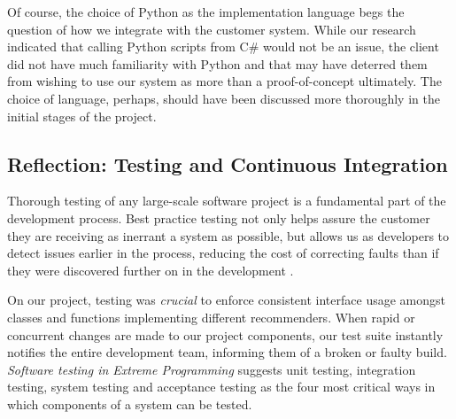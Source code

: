 \documentclass{l3proj}
\begin{document}
Of course, the choice of Python as the implementation language begs the question of how we integrate with the customer system. While our research indicated that calling Python scripts from C\# would not be an issue, the client did not have much familiarity with Python and that may have deterred them from wishing to use our system as more than a proof-of-concept ultimately. The choice of language, perhaps, should have been discussed more thoroughly in the initial stages of the project.

\subsection{Reflection: Testing and Continuous Integration}
\label{sec:testing}
% 




Thorough testing of any large-scale software project is a fundamental part of the development process. Best practice testing not only helps assure the customer they are receiving as inerrant a system as possible, but allows us as developers to detect issues earlier in the process, reducing the cost of correcting faults than if they were discovered further on in the development \cite{SoftwareEconomics}. 

On our project, testing was \textit{crucial} to enforce consistent interface usage amongst classes and functions implementing different recommenders. When rapid or concurrent changes are made to our project components, our test suite instantly notifies the entire development team, informing them of a broken or faulty build. \textit{Software testing in Extreme Programming} \cite{SoftwareTesting} suggests unit testing, integration testing, system testing and acceptance testing as the four most critical ways in which components of a system can be tested. 
\end{document}
